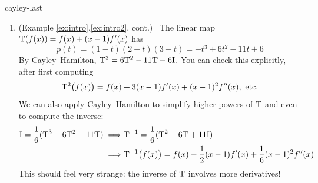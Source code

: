 \begin{examples}{}{cayley-last}
\begin{enumerate}
		
		\item\label{exs:cayleyham} (Example \ref*{ex:intro}.\ref{ex:intro2}, cont.) \ The linear map $\mathrm{T}(f(x))=f(x)+(x-1)f'(x)$ has
		\[
			p(t)=(1-t)(2-t)(3-t)=-t^3+6t^2-11t+6
		\]
		By Cayley--Hamilton, $\mathrm{T}^3=6\mathrm{T}^2-11\mathrm{T}+6\mathrm{I}$. You can check this explicitly, after first computing
		\begin{gather*}
			\rT^2\big(f(x)\big)=f(x)+3(x-1)f'(x)+(x-1)^2f''(x),\ \text{etc.}%
		\end{gather*}
		We can also apply Cayley--Hamilton to simplify higher powers of $\mathrm{T}$ and even to compute the inverse:
		\begin{align*}
			\mathrm{I}=\frac 16(\mathrm{T}^3-6\mathrm{T}^2+11\mathrm{T}) \implies
			& \mathrm{T}^{-1}=\frac 16(\mathrm{T}^2-6\mathrm{T}+11\mathrm{I})\\	
			\implies
			&\mathrm{T}^{-1}\big(f(x)\big) =f(x)-\frac 12(x-1)f'(x)+\frac 16(x-1)^2f''(x)
		\end{align*}
		This should feel very strange: the inverse of $\mathrm{T}$ involves more derivatives! 
	\end{enumerate}
\end{examples}


\vfil


